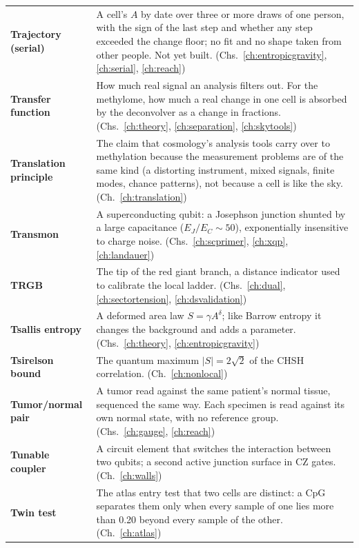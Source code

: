 {\begin{longtable}{@{}>{\raggedright\arraybackslash}p{}>{\raggedright\arraybackslash}p{}@{}}
\textbf{Trajectory (serial)} & A cell's $A$ by date over three or more draws of one person, with the sign of the last step and whether any step exceeded the change floor; no fit and no shape taken from other people. Not yet built. {\footnotesize(Chs.~\ref{ch:entropicgravity}, \ref{ch:serial}, \ref{ch:reach})}\\[1pt]
\textbf{Transfer function} & How much real signal an analysis filters out. For the methylome, how much a real change in one cell is absorbed by the deconvolver as a change in fractions. {\footnotesize(Chs.~\ref{ch:theory}, \ref{ch:separation}, \ref{ch:skytools})}\\[1pt]
\textbf{Translation principle} & The claim that cosmology's analysis tools carry over to methylation because the measurement problems are of the same kind (a distorting instrument, mixed signals, finite modes, chance patterns), not because a cell is like the sky. {\footnotesize(Ch.~\ref{ch:translation})}\\[1pt]
\textbf{Transmon} & A superconducting qubit: a Josephson junction shunted by a large capacitance ($E_J/E_C\sim50$), exponentially insensitive to charge noise. {\footnotesize(Chs.~\ref{ch:scprimer}, \ref{ch:xqp}, \ref{ch:landauer})}\\[1pt]
\textbf{TRGB} & The tip of the red giant branch, a distance indicator used to calibrate the local ladder. {\footnotesize(Chs.~\ref{ch:dual}, \ref{ch:sectortension}, \ref{ch:dsvalidation})}\\[1pt]
\textbf{Tsallis entropy} & A deformed area law $S=\gamma A^\delta$; like Barrow entropy it changes the background and adds a parameter. {\footnotesize(Chs.~\ref{ch:theory}, \ref{ch:entropicgravity})}\\[1pt]
\textbf{Tsirelson bound} & The quantum maximum $|S|=2\sqrt2$ of the CHSH correlation. {\footnotesize(Ch.~\ref{ch:nonlocal})}\\[1pt]
\textbf{Tumor/normal pair} & A tumor read against the same patient's normal tissue, sequenced the same way. Each specimen is read against its own normal state, with no reference group. {\footnotesize(Chs.~\ref{ch:gauge}, \ref{ch:reach})}\\[1pt]
\textbf{Tunable coupler} & A circuit element that switches the interaction between two qubits; a second active junction surface in CZ gates. {\footnotesize(Ch.~\ref{ch:walls})}\\[1pt]
\textbf{Twin test} & The atlas entry test that two cells are distinct: a CpG separates them only when every sample of one lies more than 0.20 beyond every sample of the other. {\footnotesize(Ch.~\ref{ch:atlas})}\\[1pt]

\end{longtable}}
